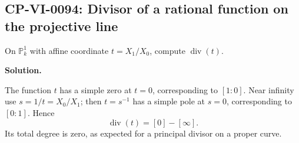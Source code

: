 
\subsection*{CP-VI-0094: Divisor of a rational function on the projective line}

On $\mathbb P_k^1$ with affine coordinate $t=X_1/X_0$, compute $\operatorname{div}(t)$.

\medskip
\noindent\textbf{Solution.}

The function $t$ has a simple zero at $t=0$, corresponding to $[1:0]$. Near infinity use $s=1/t=X_0/X_1$; then $t=s^{-1}$ has a simple pole at $s=0$, corresponding to $[0:1]$. Hence
\[
\operatorname{div}(t)=[0]-[\infty].
\]
Its total degree is zero, as expected for a principal divisor on a proper curve.
